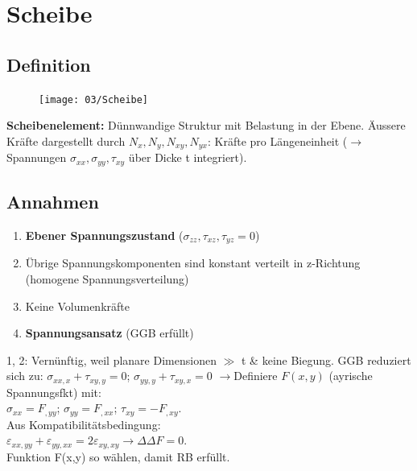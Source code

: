 \section{Scheibe}
    \subsection{Definition}
        \begin{figure}
            \vspace{-5mm}
            \texttt{[image: 03/Scheibe]}
        \end{figure}
        \textbf{Scheibenelement:} Dünnwandige Struktur mit Belastung in der Ebene. Äussere Kräfte dargestellt durch $N_x,N_y,N_{xy},N_{yx}$: Kräfte pro Längeneinheit ($\rightarrow$ Spannungen $\sigma_{xx},\sigma_{yy},\tau_{xy}$ über Dicke t integriert).
    
    \subsection{Annahmen}
        \begin{enumerate}[noitemsep]
            \item \textbf{Ebener Spannungszustand} ($\sigma_{zz},\tau_{xz},\tau_{yz}=0$)
            \item Übrige Spannungskomponenten sind konstant verteilt in z-Richtung (homogene Spannungsverteilung)
            \item Keine Volumenkräfte
            \item \textbf{Spannungsansatz} (GGB erfüllt)
        \end{enumerate}
        1, 2: Vernünftig, weil planare Dimensionen $\gg$ t \& keine Biegung. GGB reduziert sich zu: $\displaystyle\sigma_{xx,x} + \tau_{xy,y}=0$; $\sigma_{yy,y} + \tau_{xy,x}=0$
        $\rightarrow$Definiere $F(x,y)$ (ayrische Spannungsfkt) mit:\\ $\sigma_{xx}=F_{,yy}$; $\sigma_{yy}=F_{,xx}$; $\tau_{xy}=-F_{,xy}$. 
        \\Aus Kompatibilitätsbedingung:\\ $\varepsilon_{xx,yy}+\varepsilon_{yy,xx}=2\varepsilon_{xy,xy} \rightarrow \Delta\Delta F=0$.
        \\Funktion F(x,y) so wählen, damit RB erfüllt.
\columnbreak    
